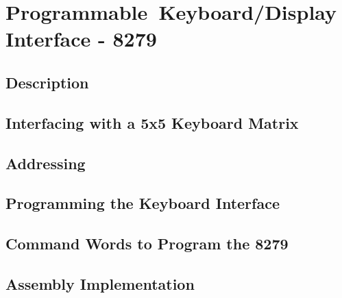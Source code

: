 \newpage
\section{Programmable Keyboard/Display Interface - 8279}

    \subsection{Description}

    \subsection{Interfacing with a 5x5 Keyboard Matrix}

    \subsection{Addressing}

    \subsection{Programming the Keyboard Interface}

    \subsection{Command Words to Program the 8279}

    \subsection{Assembly Implementation}
